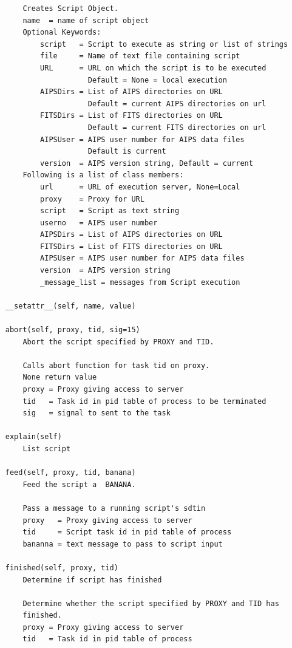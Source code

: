 \documentclass[11pt]{report}
\begin{document}
\begin{verbatim}
         Creates Script Object.
         name  = name of script object
         Optional Keywords:
             script   = Script to execute as string or list of strings
             file     = Name of text file containing script
             URL      = URL on which the script is to be executed
                        Default = None = local execution
             AIPSDirs = List of AIPS directories on URL
                        Default = current AIPS directories on url
             FITSDirs = List of FITS directories on URL
                        Default = current FITS directories on url
             AIPSUser = AIPS user number for AIPS data files
                        Default is current
             version  = AIPS version string, Default = current
         Following is a list of class members:
             url      = URL of execution server, None=Local
             proxy    = Proxy for URL
             script   = Script as text string
             userno   = AIPS user number
             AIPSDirs = List of AIPS directories on URL
             FITSDirs = List of FITS directories on URL
             AIPSUser = AIPS user number for AIPS data files
             version  = AIPS version string
             _message_list = messages from Script execution
     
     __setattr__(self, name, value)
     
     abort(self, proxy, tid, sig=15)
         Abort the script specified by PROXY and TID.
         
         Calls abort function for task tid on proxy.
         None return value
         proxy = Proxy giving access to server
         tid   = Task id in pid table of process to be terminated
         sig   = signal to sent to the task
     
     explain(self)
         List script
     
     feed(self, proxy, tid, banana)
         Feed the script a  BANANA.
         
         Pass a message to a running script's sdtin
         proxy   = Proxy giving access to server
         tid     = Script task id in pid table of process
         bananna = text message to pass to script input
     
     finished(self, proxy, tid)
         Determine if script has finished 
         
         Determine whether the script specified by PROXY and TID has
         finished.
         proxy = Proxy giving access to server
         tid   = Task id in pid table of process
     

\end{verbatim}
\end{document}
